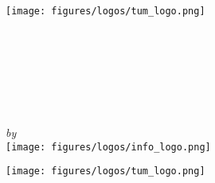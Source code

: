 \begin{titlepage}
    \makeatletter
    \begin{center}
        \texttt{[image: figures/logos/tum\_logo.png]}\\[0.5cm]
        \begin{Huge}
            \MakeUppercase{\getFaculty}
        \end{Huge}\\[0.5cm]
        \begin{large}
            \MakeUppercase{\getUniversity}
        \end{large}\\[2cm]
        \begin{Large}
            \getDoctype%
        \end{Large}\\[2cm]
        \begin{Huge}
            \@title\par
        \end{Huge}
        \vspace{5mm}
        \begin{Large}
            \@subtitle
        \end{Large}\\
        \emph{by}\\
        \getAuthor
        \vfill
        \texttt{[image: figures/logos/info\_logo.png]}\\
    \end{center}
    \newpage
    \thispagestyle{empty}
    \begin{center}
        \texttt{[image: figures/logos/tum\_logo.png]}\\[0.5cm]
        \begin{Huge}
            \MakeUppercase{\getFaculty}
        \end{Huge}\\[0.5cm]
        \begin{large}
            \MakeUppercase{\getUniversity}
        \end{large}\\[2cm]
        \begin{Large}

\end{Large}
\end{center}
\end{titlepage}
